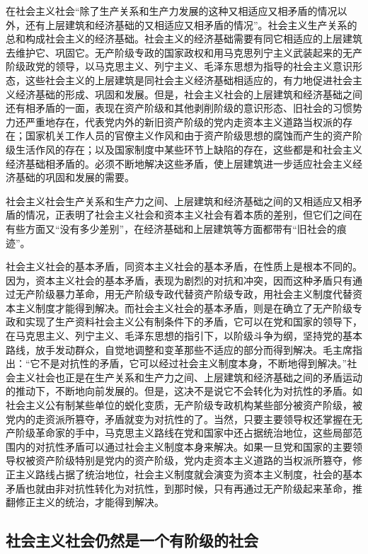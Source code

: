 \documentclass{book}
\begin{document}
在社会主义社会“除了生产关系和生产力发展的这种又相适应又相矛盾的情况以外，还有上层建筑和经济基础的又相适应又相矛盾的情况”。社会主义生产关系的总和构成社会主义的经济基础。社会主义的经济基础需要有同它相适应的上层建筑去维护它、巩固它。无产阶级专政的国家政权和用马克思列宁主义武装起来的无产阶级政党的领导，以马克思主义、列宁主义、毛泽东思想为指导的社会主义意识形态，这些社会主义的上层建筑是同社会主义经济基础相适应的，有力地促进社会主义经济基础的形成、巩固和发展。但是，社会主义社会的上层建筑和经济基础之间还有相矛盾的一面，表现在资产阶级和其他剥削阶级的意识形态、旧社会的习惯势力还严重地存在，代表党内外的新旧资产阶级的党内走资本主义道路当权派的存在；国家机关工作人员的官僚主义作风和由于资产阶级思想的腐蚀而产生的资产阶级生活作风的存在；以及国家制度中某些环节上缺陷的存在，这些都是和社会主义经济基础相矛盾的。必须不断地解决这些矛盾，使上层建筑进一步适应社会主义经济基础的巩固和发展的需要。

社会主义社会生产关系和生产力之间、上层建筑和经济基础之间的又相适应又相矛盾的情况，正表明了社会主义社会和资本主义社会有着本质的差别，但它们之间在有些方面又“没有多少差别”，在经济基础和上层建筑等方面都带有“旧社会的痕迹”。

社会主义社会的基本矛盾，同资本主义社会的基本矛盾，在性质上是根本不同的。因为，资本主义社会的基本矛盾，表现为剧烈的对抗和冲突，因而这种矛盾只有通过无产阶级暴力革命，用无产阶级专政代替资产阶级专政，用社会主义制度代替资本主义制度才能得到解决。而社会主义社会的基本矛盾，则是在确立了无产阶级专政和实现了生产资料社会主义公有制条件下的矛盾，它可以在党和国家的领导下，在马克思主义、列宁主义、毛泽东思想的指引下，以阶级斗争为纲，坚持党的基本路线，放手发动群众，自觉地调整和变革那些不适应的部分而得到解决。毛主席指出：“它不是对抗性的矛盾，它可以经过社会主义制度本身，不断地得到解决。”社会主义社会也正是在生产关系和生产力之间、上层建筑和经济基础之间的矛盾运动的推动下，不断地向前发展的。但是，这决不是说它不会转化为对抗性的矛盾。如社会主义公有制某些单位的蜕化变质，无产阶级专政机构某些部分被资产阶级，被党内的走资派所篡夺，矛盾就变为对抗性的了。当然，只要主要领导权还掌握在无产阶级革命家的手中，马克思主义路线在党和国家中还占据统治地位，这些局部范围内的对抗性矛盾可以通过社会主义制度本身来解决。如果一旦党和国家的主要领导权被资产阶级特别是党内的资产阶级，党内走资本主义道路的当权派所篡夺，修正主义路线占据了统治地位，社会主义制度就会演变为资本主义制度，社会的基本矛盾也就由非对抗性转化为对抗性，到那时候，只有再通过无产阶级起来革命，推翻修正主义的统治，才能得到解决。

\subsection{社会主义社会仍然是一个有阶级的社会}
\end{document}
